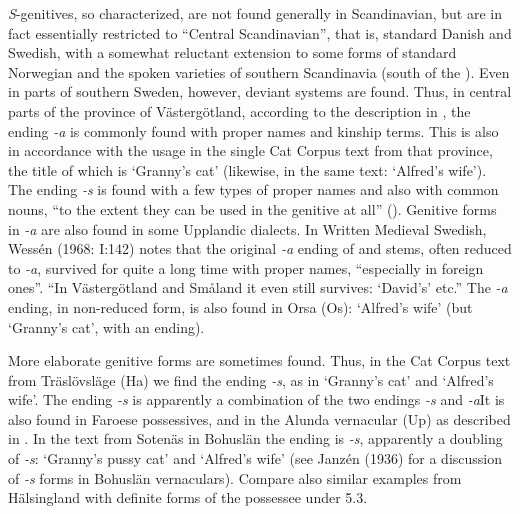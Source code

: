 
\textit{S}{}-genitives, so characterized, are not found generally in Scandinavian, but are in fact essentially restricted to “Central Scandinavian”, that is, standard Danish and Swedish, with a somewhat reluctant extension to some forms of standard Norwegian and the spoken varieties of southern Scandinavia (south of the ). Even in parts of southern Sweden, however, deviant systems are found. Thus, in central parts of the province of Västergötland, according to the description in \citet{Landtmanson1952}, the ending\textit{ {}-a} is commonly found with proper names and kinship terms. This is also in accordance with the usage in the single Cat Corpus text from that province, the title of which is  ‘Granny’s cat’ (likewise, in the same text:  ‘Alfred’s wife’). The ending\textit{ {}-s} is found with a few types of proper names and also with common nouns, “to the extent they can be used in the genitive at all” (\citet[68]{Landtmanson1952}). Genitive forms in\textit{ {}-a} are also found in some Upplandic dialects. In Written Medieval Swedish, Wessén (1968: I:142) notes that the original\textit{ {}-a} ending of  and stems, often reduced to\textit{ }\textit{{}-}\textit{a},  survived for quite a long time with proper names, “especially in foreign ones”. “In Västergötland and Småland it even still survives:  ‘David’s’ etc.” The\textit{ {}-a} ending, in non-reduced form, is also found in Orsa (Os):  ‘Alfred’s wife’ (but  ‘Granny’s cat’, with an ending).


 More elaborate genitive forms are sometimes found. Thus, in the Cat Corpus text from Träslövsläge (Ha) we find the ending\textit{ {}-s}, as in ‘Granny’s cat’ and ‘Alfred’s wife’. The ending\textit{ {}-s} is apparently a combination of the two endings\textit{ {}-s} and\textit{ {}-a}It is also found in Faroese possessives, and in the Alunda vernacular (Up) as described in \citet{Bergman1893}. In the text from Sotenäs in Bohuslän the ending is\textit{ {}-s}, apparently a doubling of\textit{ {}-s}:  ‘Granny’s pussy cat’ and  ‘Alfred’s wife’ (see Janzén (1936) for a discussion of\textit{ {}-s} forms in Bohuslän vernaculars). Compare also similar examples from Hälsingland with definite forms of the possessee under 5.3. 

